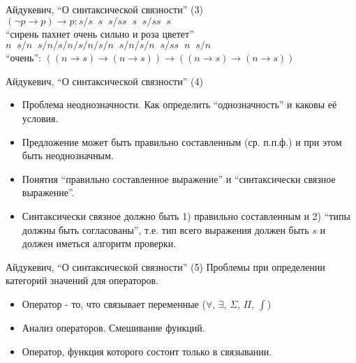 \documentclass{beamer}
\begin{document}
\begin{frame}{Айдукевич, ``О синтаксической связности'' (3)}
$(\neg p \to p) \to p : s/s \;\; s \;\; s/ss \;\; s \;\; s/ss \;\; s$\\
\bigskip
``сирень пахнет очень сильно и роза цветет''\\$n \;\; s/n \;\; s/n/s/n/s/n/s/n \;\; s/n/s/n \;\; s/ss \;\; n \;\; s/n$\\
\bigskip
``очень'': $((n \to s) \to (n \to s)) \to ((n \to s) \to (n \to s))$
\end{frame}

\begin{frame}{Айдукевич, ``О синтаксической связности'' (4)}
\begin{itemize}
  \item Проблема неоднозначности. Как определить ``однозначность'' и каковы её условия.
  \item Предложение может быть правильно составленным (ср. п.п.ф.) и при этом быть неоднозначным.
  \item Понятия ``правильно составленное выражение'' и ``синтаксически связное выражение''.
  \item Синтаксически связное должно быть 1) правильно составленным и 2) ``типы должны быть согласованы'', т.е. тип всего выражения должен быть $s$ и должен иметься алгоритм проверки.
\end{itemize}
\end{frame}

\begin{frame}{Айдукевич, ``О синтаксической связности'' (5)}
Проблемы при определении категорий значений для операторов.\\
\bigskip
\begin{itemize}
  \item Оператор - то, что связывает переменные ($\forall$, $\exists$, $\Sigma$, $\Pi$, $\int$)
  \item Анализ операторов. Смешивание функций. 
  \item Оператор, функция которого состоит только в связывании.
\end{itemize}
\end{frame}
\end{document}
